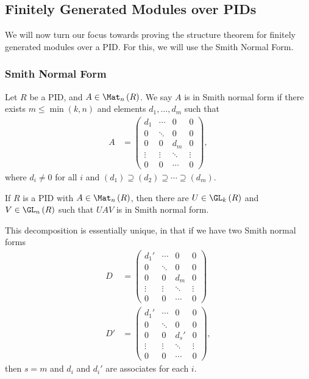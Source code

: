\documentclass[10pt]{mypackage}
\begin{document}
\subsection{Finitely Generated Modules over PIDs}%
We will now turn our focus towards proving the structure theorem for finitely generated modules over a PID. For this, we will use the Smith Normal Form.
\subsubsection{Smith Normal Form}%
\begin{definition}
  Let $R$ be a PID, and $A\in \Mat_n\left( R \right)$. We say $A$ is in Smith normal form if there exists $m\leq \min\left( k,n \right)$ and elements $d_1,\dots,d_m$ such that
  \begin{align*}
    A &= \begin{pmatrix}d_1 & \cdots & 0 & 0 \\ 0 & \ddots & 0 & 0\\
      0 &0 &  d_m & 0 \\
      \vdots & \vdots & \ddots & \vdots\\
    0 & 0 & \cdots & 0\end{pmatrix},
  \end{align*}
  where $d_i\neq 0$ for all $i$ and $ \left( d_1 \right)\supseteq \left( d_2 \right)\supseteq\cdots\supseteq \left( d_m \right) $.
\end{definition}
\begin{theorem}
  If $R$ is a PID with $A\in \Mat_n\left( R \right)$, then there are $U\in \GL_k\left( R \right)$ and $V\in \GL_n\left( R \right)$ such that $UAV$ is in Smith normal form.

  This decomposition is essentially unique, in that if we have two Smith normal forms
  \begin{align*}
    D &= \begin{pmatrix}d_1' & \cdots & 0 & 0 \\ 0 & \ddots & 0 & 0\\
      0 &0 &  d_m & 0 \\
      \vdots & \vdots & \ddots & \vdots\\
    0 & 0 & \cdots & 0\end{pmatrix}\\
    D' &= \begin{pmatrix}d_1' & \cdots & 0 & 0 \\ 0 & \ddots & 0 & 0\\
      0 &0 &  d_s' & 0 \\
      \vdots & \vdots & \ddots & \vdots\\
    0 & 0 & \cdots & 0\end{pmatrix},
  \end{align*}
  then $s = m$ and $d_i$ and $d_i'$ are associates for each $i$.
\end{theorem}
\end{document}
